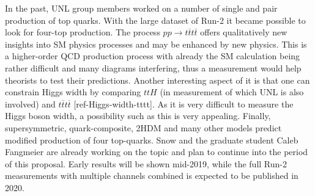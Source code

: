 In the past, UNL group members worked on a number of single and pair production of top quarks. With the large dataset of Run-2 it became possible to look for four-top production. The process $pp\to t\overline{t}t\overline{t}$ offers qualitatively new insights into SM physics processes and may be enhanced by new physics. This is a higher-order QCD production process with already the SM calculation being rather difficult and many diagrams interfering, thus a measurement would help theorists to test their predictions. Another interesting aspect of it is that one can constrain Higgs width by comparing $ttH$ (in measurement of which UNL is also involved) and $t\overline{t}t\overline{t}$ [ref-Higgs-width-tttt]. As it is very difficult to measure the Higgs boson width, a possibility such as this is very appealing. Finally, supersymmetric, quark-composite, 2HDM and many other models predict modified production of four top-quarks. Snow and the graduate student Caleb Fangmeier are already working on the topic and plan to continue into the period of this proposal. Early results will be shown mid-2019, while the full Run-2 measurements with multiple channels combined is expected to be published in 2020.

